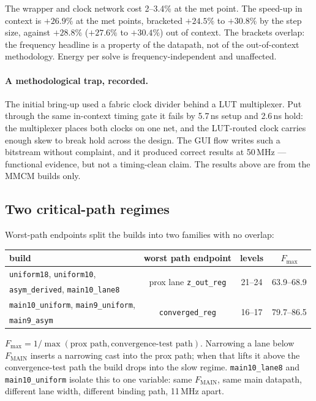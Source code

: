 \documentclass[11pt,a4paper]{article}
\begin{document}
The wrapper and clock network cost 2--3.4\% at the met point. The speed-up
in context is $+26.9\%$ at the met points, bracketed $+24.5\%$ to $+30.8\%$
by the step size, against $+28.8\%$ ($+27.6\%$ to $+30.4\%$) out of context.
The brackets overlap: the frequency headline is a property of the datapath,
not of the out-of-context methodology. Energy per solve is
frequency-independent and unaffected.

\paragraph{A methodological trap, recorded.} The initial bring-up used a
fabric clock divider behind a LUT multiplexer. Put through the same in-context
timing gate it fails by 5.7\,ns setup and 2.6\,ns hold: the multiplexer places
both clocks on one net, and the LUT-routed clock carries enough skew to break
hold across the design. The GUI flow writes such a bitstream without
complaint, and it produced correct results at 50\,MHz --- functional evidence,
but not a timing-clean claim. The results above are from the MMCM builds only.

\subsection{Two critical-path regimes}

Worst-path endpoints split the builds into two families with no overlap:

\begin{table}[h]\centering\small
\begin{tabular}{lccc}
\toprule
build & worst path endpoint & levels & $F_{\max}$ \\
\midrule
\texttt{uniform18}, \texttt{uniform10}, & \multirow{2}{*}{prox lane
  \texttt{z\_out\_reg}} & \multirow{2}{*}{21--24} & \multirow{2}{*}{63.9--68.9}\\
\texttt{asym\_derived}, \texttt{main10\_lane8} & & & \\
\midrule
\texttt{main10\_uniform}, \texttt{main9\_uniform}, & \multirow{2}{*}{
  \texttt{converged\_reg}} & \multirow{2}{*}{16--17} &
  \multirow{2}{*}{79.7--86.5}\\
\texttt{main9\_asym} & & & \\
\bottomrule
\end{tabular}
\end{table}

$F_{\max} = 1/\max(\text{prox path}, \text{convergence-test path})$. Narrowing
a lane below $F_{\text{MAIN}}$ inserts a narrowing cast into the prox path;
when that lifts it above the convergence-test path the build drops into the
slow regime. \texttt{main10\_lane8} and \texttt{main10\_uniform} isolate this to
one variable: same $F_{\text{MAIN}}$, same main datapath, different lane width,
different binding path, 11\,MHz apart.
\end{document}
